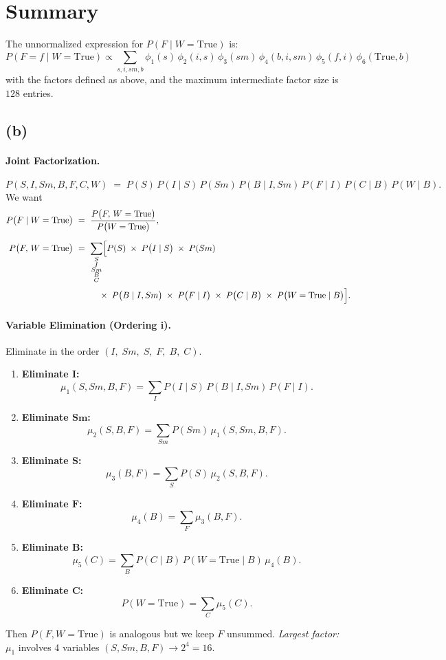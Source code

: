\documentclass[11pt]{article}
\begin{document}
\section*{Summary}
The unnormalized expression for \(P(F \mid W=\text{True})\) is:
\[
\boxed{
P(F=f \mid W=\text{True}) \propto \sum_{s,i,sm,b} \phi_1(s)\,\phi_2(i,s)\,\phi_3(sm)\,\phi_4(b,i,sm)\,\phi_5(f,i)\,\phi_6(\text{True},b)
}
\]
with the factors defined as above, and the maximum intermediate factor size is \(128\) entries.
\subsection*{(b)}

\paragraph{Joint Factorization.}
\[
P(S,I,Sm,B,F,C,W)
\;=\;
P(S)\,P(I\mid S)\,P(Sm)\,P(B\mid I,Sm)\,P(F\mid I)\,P(C\mid B)\,P(W\mid B).
\]
We want
\[
\begin{aligned}
P\bigl(F \mid W=\text{True}\bigr)
&~=~
\frac{P\bigl(F,\,W=\text{True}\bigr)}{P\bigl(W=\text{True}\bigr)},
\\[6pt]
P\bigl(F,\,W=\text{True}\bigr)
&~=~
\sum_{\substack{S\\ I\\ Sm\\ B\\ C}}
\Bigl[
  P(S)
  \;\times\;
  P\bigl(I \mid S\bigr)
  \;\times\;
  P(Sm)
  \\[2pt]
&\qquad\quad{}\times\;
  P\bigl(B \mid I,Sm\bigr)
  \;\times\;
  P\bigl(F \mid I\bigr)
  \;\times\;
  P\bigl(C \mid B\bigr)
  \;\times\;
  P\bigl(W=\text{True}\mid B\bigr)
\Bigr].
\end{aligned}
\]


\paragraph{Variable Elimination (Ordering i).}
Eliminate in the order \((I,\;Sm,\;S,\;F,\;B,\;C)\).  
\begin{enumerate}
\item \textbf{Eliminate \(\boldsymbol{I}\):}
\[
\mu_1(S,Sm,B,F)
=\sum_{I}
P(I\mid S)\,P(B\mid I,Sm)\,P(F\mid I).
\]
\item \textbf{Eliminate \(\boldsymbol{Sm}\):}
\[
\mu_2(S,B,F)
=\sum_{Sm}
P(Sm)\,\mu_1(S,Sm,B,F).
\]
\item \textbf{Eliminate \(\boldsymbol{S}\):}
\[
\mu_3(B,F)
=\sum_{S}
P(S)\,\mu_2(S,B,F).
\]
\item \textbf{Eliminate \(\boldsymbol{F}\):}
\[
\mu_4(B)
=\sum_{F}
\mu_3(B,F).
\]
\item \textbf{Eliminate \(\boldsymbol{B}\):}
\[
\mu_5(C)
=\sum_{B}
P(C\mid B)\,P(W=\text{True}\mid B)\,\mu_4(B).
\]
\item \textbf{Eliminate \(\boldsymbol{C}\):}
\[
P(W=\text{True})
=\sum_{C}
\mu_5(C).
\]
\end{enumerate}
Then \(P(F,W=\text{True})\) is analogous but we keep \(F\) unsummed.  
\textit{Largest factor:} \(\mu_1\) involves 4 variables \((S,Sm,B,F)\)\(\to 2^4=16\).
\end{document}

